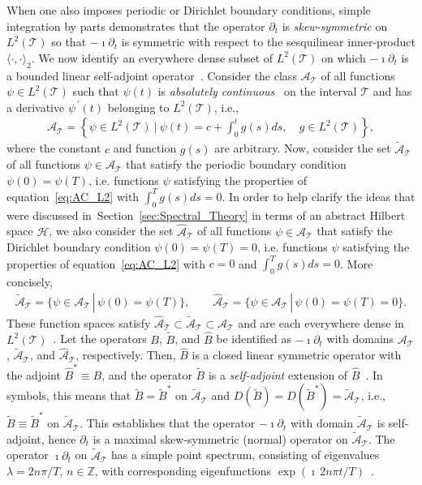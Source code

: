 \documentclass[leqno,onefignum,onetabnum]{siamltex1213}
\newcommand{\secref}[1]{Section~\ref{#1}}
\newcommand{\Tc}{\mathcal{T}}
\newcommand{\Hs}{\mathscr{H}}
\newcommand{\As}{\mathscr{A}}
\begin{document}
When one also imposes periodic or Dirichlet boundary conditions,
simple integration by parts demonstrates that the operator $\partial_t$ is
\emph{skew-symmetric} on $L^2(\Tc)$ so that $-\imath\partial_t$ is symmetric with
respect to the sesquilinear inner-product $\langle\cdot,\cdot\rangle_2$. We now identify an
everywhere dense subset of $L^2(\Tc)$ on which $-\imath\partial_t$ is a bounded
linear self-adjoint operator~\cite{Reed-1980,Stone:64}. Consider the
class $\As_{\Tc}$ of all functions $\psi\in L^2(\Tc)$ such that $\psi(t)$ is
\emph{absolutely continuous}~\cite{Royden:1988:RA} on the interval
$\Tc$ and has a derivative $\psi^{\,\prime}(t)$ belonging to $L^2(\Tc)$,
i.e.,~\cite{Stone:64,Royden:1988:RA}     
%
\begin{align}\label{eq:AC_L2}
  \As_{\Tc}=
     \left\{
       \psi\in L^2(\Tc) \ \Big| \ \psi(t)=c+\int_0^tg(s)ds,
       \quad  g\in L^2(\Tc)
     \right\},
\end{align}
%
where the constant $c$ and function $g(s)$ are
arbitrary. Now, consider the set $\tilde{\As}_{\Tc}$ of all
functions $\psi\in\As_{\Tc}$ that satisfy the periodic boundary condition
$\psi(0)=\psi(T)$, i.e. functions $\psi$ satisfying the properties of 
equation~\eqref{eq:AC_L2} with $\int_0^Tg(s)ds=0$. In order to help
clarify the ideas that were discussed in~\secref{sec:Spectral_Theory}
in terms of an abstract 
Hilbert space $\Hs$, we also consider the set $\hat{\As}_{\Tc}$ of all
functions $\psi\in\As_{\Tc}$ that satisfy the Dirichlet boundary condition
$\psi(0)=\psi(T)=0$, i.e. functions $\psi$ satisfying the properties of
equation~\eqref{eq:AC_L2} with $c=0$ and $\int_0^Tg(s)ds=0$. More
concisely,  
%
\begin{align}\label{eq:AC_BC}
  \tilde{\As}_{\Tc}=\{\psi\in\As_{\Tc} \,|\, \psi(0)=\psi(T)\},
  \qquad
  \hat{\As}_{\Tc}=\{\psi\in\As_{\Tc} \,|\, \psi(0)=\psi(T)=0\}.
\end{align}
%
These function spaces satisfy
$\hat{\As}_{\Tc}\subset\tilde{\As}_{\Tc}\subset\As_{\Tc}$ and are each everywhere
dense in $L^2(\Tc)$~\cite{Stone:64}. Let the operators $B$,
$\tilde{B}$, and $\hat{B}$ be identified as $-\imath\partial_t$ with domains
$\As_{\Tc}$, $\tilde{\As}_{\Tc}$, and $\hat{\As}_{\Tc}$,
respectively. Then, $\hat{B}$ is a closed linear symmetric operator
with the adjoint $\hat{B}^*\equiv B$, and the operator $\tilde{B}$ is a
\emph{self-adjoint} extension of $\hat{B}$~\cite{Stone:64}. In
symbols, this means that $\tilde{B}=\tilde{B}^*$ on
$\tilde{\As}_{\Tc}$ and
$D(\tilde{B})=D(\tilde{B}^*)=\tilde{\As}_{\Tc}$,
i.e., $\tilde{B}\equiv\tilde{B}^*$ on $\tilde{\As}_{\Tc}$. This establishes
that the operator $-\imath\partial_t$ with domain $\tilde{\As}_{\Tc}$ is
self-adjoint, hence $\partial_t$ is a maximal skew-symmetric (normal)
operator on $\tilde{\As}_{\Tc}$. The operator $\imath\partial_t$ on
$\tilde{\As}_{\Tc}$ has a simple point spectrum, consisting of
eigenvalues $\lambda=2n\pi/T$, $n\in\mathbb{Z}$, with corresponding
eigenfunctions $\exp(\imath\,2n\pi t/T)$~\cite{Stone:64}.
\end{document}
